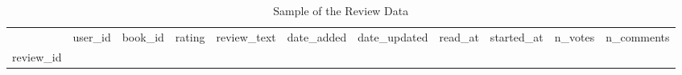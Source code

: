 \begin{table*}
\centering
\caption{Sample of the Review Data}
\label{tab:review_cols}
\begin{tabularx}{\textwidth}{llrrlllllrr}
\toprule
{} &    user\_id &   book\_id &  rating &                                        review\_text &                      date\_added &                    date\_updated &                         read\_at &                      started\_at &  n\_votes &  n\_comments \\
review\_id &            &           &         &                                                    &                                 &                                 &                                 &                                 &          &             \\
\midrule
\bottomrule
\end{tabularx}
\end{table*}
